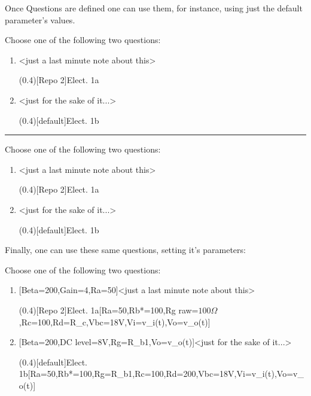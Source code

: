 \documentclass[10pt]{article}
\begin{document}


Once Questions are defined one can use them, for instance, using just the default parameter's values.

\begin{codestore}[QuestionDefault]
Choose one of the following two questions:

\begin{enumerate}
  \item {}<just a last minute note about this>\par
  \ftikzQuestion(0.4)[Repo 2]{Elect. 1a}
  
  \item {}<just for the sake of it...>\par
  \ftikzQuestion(0.4)[default]{Elect. 1b}
\end{enumerate}
\end{codestore}



\hrule\relax\vspace{0.5ex}

Choose one of the following two questions:

\begin{enumerate}
  \item {}<just a last minute note about this>\par
  \ftikzQuestion(0.4)[Repo 2]{Elect. 1a}
  
  \item {}<just for the sake of it...>\par
  \ftikzQuestion(0.4)[default]{Elect. 1b}
\end{enumerate}

Finally, one can use these same questions, setting it's parameters:

\begin{codestore}[QuestionUse]
Choose one of the following two questions:

\begin{enumerate}
  \item {}[Beta=200,Gain=4,Ra=50\Omega]<just a last minute note about this>\par
  \ftikzQuestion(0.4)[Repo 2]{Elect. 1a}[Ra=50\Omega,Rb*=100\Omega,Rg raw=$100\Omega$,Rc=100\Omega,Rd=R_c,Vbc=18V,Vi=v_i(t),Vo=v_o(t)]
  
  \item {}[Beta=200,DC level=8V,Rg=R_{b1},Vo=v_o(t)]<just for the sake of it...>\par
  \ftikzQuestion(0.4)[default]{Elect. 1b}[Ra=50\Omega,Rb*=100\Omega,Rg=R_{b1},Rc=100\Omega,Rd=200\Omega,Vbc=18V,Vi=v_i(t),Vo=v_o(t)]
\end{enumerate}
\end{codestore}
\end{document}
